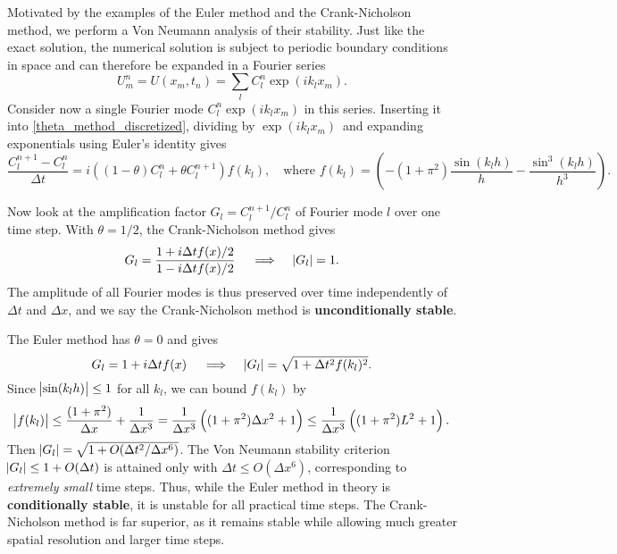 Motivated by the examples of the Euler method and the Crank-Nicholson method, we perform a Von Neumann analysis of their stability.
Just like the exact solution, the numerical solution is subject to periodic boundary conditions in space and can therefore be expanded in a Fourier series
\begin{equation}
	U_m^n = U(x_m, t_n) = \sum_l C_l^n \exp \left(i k_l x_m\right).
\end{equation}
Consider now a single Fourier mode $C_l^n \exp (i k_l x_m)$ in this series.
Inserting it into \cref{theta_method_discretized}, dividing by $\exp(i k_l x_m)$ and expanding exponentials using Euler's identity gives
\begin{equation*}
\frac{C_l^{n+1}-C_l^n}{\Delta t} = i \left(\left(1-\theta\right)C_l^n+\theta C_l^{n+1}\right) f(k_l) , \quad \text{where} \,\, f(k_l) = \left(-\left(1+\pi^2\right) \frac{\sin(k_l h)}{h} - \frac{\sin^3(k_l h)}{h^3}\right).
\end{equation*}

Now look at the amplification factor $G_l = C_l^{n+1} / C_l^n$ of Fourier mode $l$ over one time step. 
With $\theta = 1/2$, the Crank-Nicholson method gives 
\begin{equation}
	G_l = \frac{1 + i \Delta t f(x) / 2}{1 - i \Delta t f(x) / 2} \quad \implies \quad \abs{G_l} = 1.
	\label{crank_nicholson_amplification_factor}
\end{equation}
The amplitude of all Fourier modes is thus preserved over time independently of $\Delta t$ and $\Delta x$, and we say the Crank-Nicholson method is \textbf{unconditionally stable}.

The Euler method has $\theta = 0$ and gives
\begin{equation}
	G_l = 1 + i \Delta t f(x) \quad \implies \quad \abs{G_l} = \sqrt{1 + \Delta t^2 f(k_l)^2}.
	\label{euler_amplification_factor}
\end{equation}
Since $\abs{\sin(k_l h)} \leq 1$ for all $k_l$, we can bound $f(k_l)$ by
\begin{equation*}
	\abs{f(k_l)} \leq \frac{(1+\pi^2)}{\Delta x} + \frac{1}{\Delta x^3} = \frac{1}{\Delta x^3} \left( (1+\pi^2) \Delta x^2 + 1 \right) \leq \frac{1}{\Delta x^3} \left( (1+\pi^2) L^2 + 1 \right).
\end{equation*}
Then $\abs{G_l} = \sqrt{1 + O(\Delta t^2 / \Delta x^6)}$.
The Von Neumann stability criterion $\abs{G_l} \leq 1 + O(\Delta t)$ \cite{owren} is attained only with $\Delta t \leq O(\Delta x^6)$, corresponding to \emph{extremely small} time steps.
Thus, while the Euler method in theory is \textbf{conditionally stable}, it is unstable for all practical time steps.
The Crank-Nicholson method is far superior, as it remains stable while allowing much greater spatial resolution and larger time steps.

